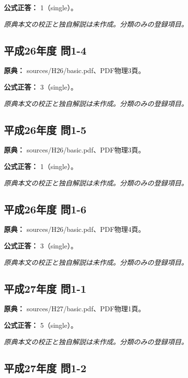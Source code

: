 \textbf{公式正答：} 1（single）。

\par\textit{原典本文の校正と独自解説は未作成。分類のみの登録項目。}

\subsection{平成26年度 問1-4}
\label{q:h26-reg-basic-1-4}

\noindent\textbf{原典：} sources/H26/basic.pdf、PDF物理3頁。

\textbf{公式正答：} 3（single）。

\par\textit{原典本文の校正と独自解説は未作成。分類のみの登録項目。}

\subsection{平成26年度 問1-5}
\label{q:h26-reg-basic-1-5}

\noindent\textbf{原典：} sources/H26/basic.pdf、PDF物理3頁。

\textbf{公式正答：} 1（single）。

\par\textit{原典本文の校正と独自解説は未作成。分類のみの登録項目。}

\subsection{平成26年度 問1-6}
\label{q:h26-reg-basic-1-6}

\noindent\textbf{原典：} sources/H26/basic.pdf、PDF物理4頁。

\textbf{公式正答：} 3（single）。

\par\textit{原典本文の校正と独自解説は未作成。分類のみの登録項目。}

\subsection{平成27年度 問1-1}
\label{q:h27-reg-basic-1-1}

\noindent\textbf{原典：} sources/H27/basic.pdf、PDF物理1頁。

\textbf{公式正答：} 5（single）。

\par\textit{原典本文の校正と独自解説は未作成。分類のみの登録項目。}

\subsection{平成27年度 問1-2}
\label{q:h27-reg-basic-1-2}

